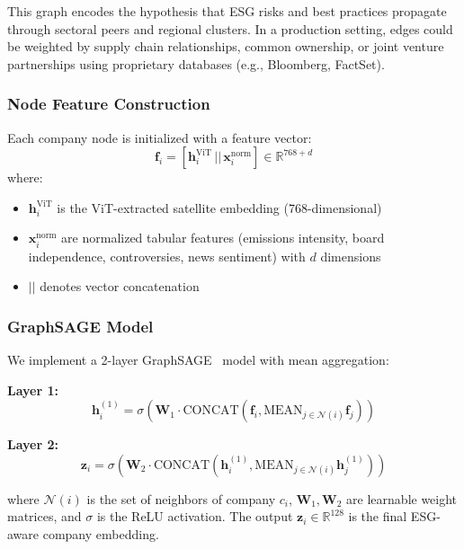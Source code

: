 This graph encodes the hypothesis that ESG risks and best practices propagate through sectoral peers and regional clusters. In a production setting, edges could be weighted by supply chain relationships, common ownership, or joint venture partnerships using proprietary databases (e.g., Bloomberg, FactSet).

\subsubsection{Node Feature Construction}

Each company node is initialized with a feature vector:
\[
\mathbf{f}_i = [\mathbf{h}_i^{\text{ViT}} \,||\, \mathbf{x}_i^{\text{norm}}] \in \mathbb{R}^{768 + d}
\]
where:
\begin{itemize}
\item $\mathbf{h}_i^{\text{ViT}}$ is the ViT-extracted satellite embedding (768-dimensional)
\item $\mathbf{x}_i^{\text{norm}}$ are normalized tabular features (emissions intensity, board independence, controversies, news sentiment) with $d$ dimensions
\item $||$ denotes vector concatenation
\end{itemize}

\subsubsection{GraphSAGE Model}

We implement a 2-layer GraphSAGE~\cite{hamilton2017inductive} model with mean aggregation:

\textbf{Layer 1:}
\[
\mathbf{h}_i^{(1)} = \sigma\left( \mathbf{W}_1 \cdot \text{CONCAT}\left(\mathbf{f}_i, \text{MEAN}_{j \in \mathcal{N}(i)} \mathbf{f}_j\right) \right)
\]

\textbf{Layer 2:}
\[
\mathbf{z}_i = \sigma\left( \mathbf{W}_2 \cdot \text{CONCAT}\left(\mathbf{h}_i^{(1)}, \text{MEAN}_{j \in \mathcal{N}(i)} \mathbf{h}_j^{(1)}\right) \right)
\]

where $\mathcal{N}(i)$ is the set of neighbors of company $c_i$, $\mathbf{W}_1, \mathbf{W}_2$ are learnable weight matrices, and $\sigma$ is the ReLU activation. The output $\mathbf{z}_i \in \mathbb{R}^{128}$ is the final ESG-aware company embedding.

